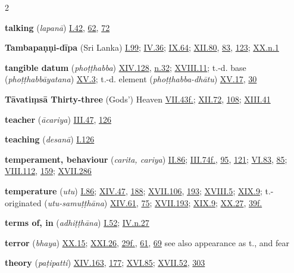\begin{multicols}{2}
\begin{vismHanging}
\par\textbf{talking} (\emph{lapanā}) \hyperlink{I.42}{I.42}{}, \hyperlink{I.62}{62}{}, \hyperlink{I.72}{72}{}
\par\textbf{Tambapaṇṇi-dīpa} (Sri Lanka) \hyperlink{I.99}{I.99}{}; \hyperlink{IV.36}{IV.36}{}; \hyperlink{IX.64}{IX.64}{}; \hyperlink{XII.80}{XII.80}{}, \hyperlink{XII.83}{83}{}, \hyperlink{XII.123}{123}{}; \hyperlink{XX.n1}{XX.n.1}{}
\par\textbf{tangible datum} (\emph{phoṭṭhabba}) \hyperlink{XIV.128}{XIV.128}{}, \hyperlink{XIV.n32}{n.32}{}; \hyperlink{XVIII.11}{XVIII.11}{}; t.-d. base (\emph{phoṭṭhabbāyatana}) \hyperlink{XV.3}{XV.3}{}; t.-d. element (\emph{phoṭṭhabba-dhātu}) \hyperlink{XV.17}{XV.17}{}, \hyperlink{XV.30}{30}{}
\par\textbf{Tāvatiṃsā Thirty-three} (Gods’) Heaven \hyperlink{VII.43}{VII.43f.}{}; \hyperlink{XII.72}{XII.72}{}, \hyperlink{XII.108}{108}{}; \hyperlink{XIII.41}{XIII.41}{}
\par\textbf{teacher} (\emph{ācariya}) \hyperlink{III.47}{III.47}{}, \hyperlink{III.126}{126}{}
\par\textbf{teaching} (\emph{desanā}) \hyperlink{I.126}{I.126}{}
\par\textbf{temperament, behaviour} (\emph{carita, cariya}) \hyperlink{II.86}{II.86}{}; \hyperlink{III.74}{III.74f.}{}, \hyperlink{III.95}{95}{}, \hyperlink{III.121}{121}{}; \hyperlink{VI.83}{VI.83}{}, \hyperlink{VI.85}{85}{}; \hyperlink{VIII.112}{VIII.112}{}, \hyperlink{VIII.159}{159}{}; \hyperlink{XVII.286}{XVII.286}{}
\par\textbf{temperature} (\emph{utu}) \hyperlink{I.86}{I.86}{}; \hyperlink{XIV.47}{XIV.47}{}, \hyperlink{XIV.188}{188}{}; \hyperlink{XVII.106}{XVII.106}{}, \hyperlink{XVII.193}{193}{}; \hyperlink{XVIII.5}{XVIII.5}{}; \hyperlink{XIX.9}{XIX.9}{}; t.-originated (\emph{utu-samuṭṭhāna}) \hyperlink{XIV.61}{XIV.61}{}, \hyperlink{XIV.75}{75}{}; \hyperlink{XVII.193}{XVII.193}{}; \hyperlink{XIX.9}{XIX.9}{}; \hyperlink{XX.27}{XX.27}{}, \hyperlink{XX.39}{39f.}{}
\par\textbf{terms of, in} (\emph{adhiṭṭhāna}) \hyperlink{I.52}{I.52}{}; \hyperlink{IV.n27}{IV.n.27}{}
\par\textbf{terror} (\emph{bhaya}) \hyperlink{XX.15}{XX.15}{}; \hyperlink{XXI.26}{XXI.26}{}, \hyperlink{XXI.29}{29f.}{}, \hyperlink{XXI.61}{61}{}, \hyperlink{XXI.69}{69}{} see also appearance as t., and fear
\par\textbf{theory} (\emph{paṭipatti}) \hyperlink{XIV.163}{XIV.163}{}, \hyperlink{XIV.177}{177}{}; \hyperlink{XVI.85}{XVI.85}{}; \hyperlink{XVII.52}{XVII.52}{}, \hyperlink{XVII.303}{303}{}

\end{vismHanging}
\end{multicols}
